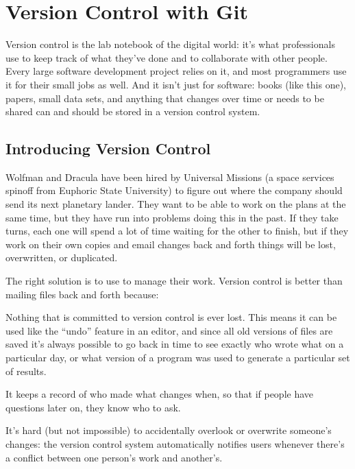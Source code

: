 \chapter{Version Control with Git}\label{s:git}

Version control is the lab notebook of the digital world: it's what
professionals use to keep track of what they've done and to collaborate
with other people. Every large software development project relies on
it, and most programmers use it for their small jobs as well. And it
isn't just for software: books (like this one), papers, small data sets,
and anything that changes over time or needs to be shared can and should
be stored in a version control system.

\section{Introducing Version Control}

Wolfman and Dracula have been hired by Universal Missions (a space
services spinoff from Euphoric State University) to figure out where the
company should send its next planetary lander. They want to be able to
work on the plans at the same time, but they have run into problems
doing this in the past. If they take turns, each one will spend a lot of
time waiting for the other to finish, but if they work on their own
copies and email changes back and forth things will be lost,
overwritten, or duplicated.

The right solution is to use  to manage their work. Version control is better than mailing
files back and forth because:

\begin{swcitemize}
\item
  Nothing that is committed to version control is ever lost. This means
  it can be used like the ``undo'' feature in an editor, and since all
  old versions of files are saved it's always possible to go back in
  time to see exactly who wrote what on a particular day, or what
  version of a program was used to generate a particular set of results.
\item
  It keeps a record of who made what changes when, so that if people
  have questions later on, they know who to ask.
\item
  It's hard (but not impossible) to accidentally overlook or overwrite
  someone's changes: the version control system automatically notifies
  users whenever there's a conflict between one person's work and
  another's.
\end{swcitemize}

